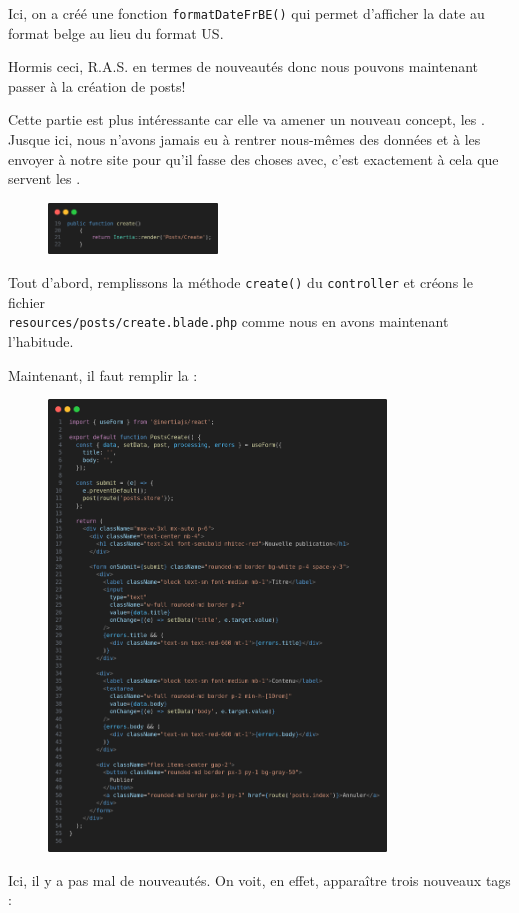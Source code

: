 Ici, on a créé une fonction \texttt{formatDateFrBE()} qui permet d'afficher la date au format belge au lieu du format US.

Hormis ceci, R.A.S. en termes de nouveautés donc nous pouvons maintenant passer à la création de posts!


Cette partie est plus intéressante car elle va amener un nouveau concept, les \forms{}. Jusque ici, nous n'avons jamais eu à rentrer nous-mêmes des données et à les envoyer à notre site pour qu'il fasse des choses avec, c'est exactement à cela que servent les \forms{}.

\begin{figure}
    \vspace{-0.5cm}
    \includegraphics[width=0.4\textwidth]{figures-C1/postscontroller_create.png}
\end{figure}
Tout d'abord, remplissons la méthode \verb|create()| du \texttt{controller} et créons le fichier \\ \verb|resources/posts/create.blade.php| comme nous en avons maintenant l'habitude.

Maintenant, il faut remplir la \view:

\begin{figure}[!h]
    \centering
    \includegraphics[width=0.8\textwidth]{figures-C1/posts_create.png}
\end{figure}
Ici, il y a pas mal de nouveautés. On voit, en effet, apparaître trois nouveaux tags \html:

